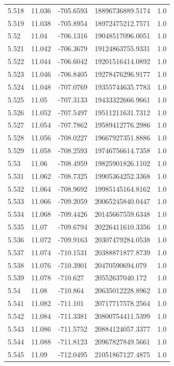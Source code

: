 \begin{tabular}{lllll}
5.518 & 11.036 & -705.6593 & 18896736889.5174 & 1.0 \\
5.519 & 11.038 & -705.8954 & 18972475212.7571 & 1.0 \\
5.52 & 11.04 & -706.1316 & 19048517096.0051 & 1.0 \\
5.521 & 11.042 & -706.3679 & 19124863755.9331 & 1.0 \\
5.522 & 11.044 & -706.6042 & 19201516414.0892 & 1.0 \\
5.523 & 11.046 & -706.8405 & 19278476296.9177 & 1.0 \\
5.524 & 11.048 & -707.0769 & 19355744635.7783 & 1.0 \\
5.525 & 11.05 & -707.3133 & 19433322666.9661 & 1.0 \\
5.526 & 11.052 & -707.5497 & 19511211631.7312 & 1.0 \\
5.527 & 11.054 & -707.7862 & 19589412776.2986 & 1.0 \\
5.528 & 11.056 & -708.0227 & 19667927351.8886 & 1.0 \\
5.529 & 11.058 & -708.2593 & 19746756614.7358 & 1.0 \\
5.53 & 11.06 & -708.4959 & 19825901826.1102 & 1.0 \\
5.531 & 11.062 & -708.7325 & 19905364252.3368 & 1.0 \\
5.532 & 11.064 & -708.9692 & 19985145164.8162 & 1.0 \\
5.533 & 11.066 & -709.2059 & 20065245840.0447 & 1.0 \\
5.534 & 11.068 & -709.4426 & 20145667559.6348 & 1.0 \\
5.535 & 11.07 & -709.6794 & 20226411610.3356 & 1.0 \\
5.536 & 11.072 & -709.9163 & 20307479284.0538 & 1.0 \\
5.537 & 11.074 & -710.1531 & 20388871877.8739 & 1.0 \\
5.538 & 11.076 & -710.3901 & 20470590694.079 & 1.0 \\
5.539 & 11.078 & -710.627 & 20552637040.172 & 1.0 \\
5.54 & 11.08 & -710.864 & 20635012228.8962 & 1.0 \\
5.541 & 11.082 & -711.101 & 20717717578.2564 & 1.0 \\
5.542 & 11.084 & -711.3381 & 20800754411.5399 & 1.0 \\
5.543 & 11.086 & -711.5752 & 20884124057.3377 & 1.0 \\
5.544 & 11.088 & -711.8123 & 20967827849.5661 & 1.0 \\
5.545 & 11.09 & -712.0495 & 21051867127.4875 & 1.0 \\

\end{tabular}
